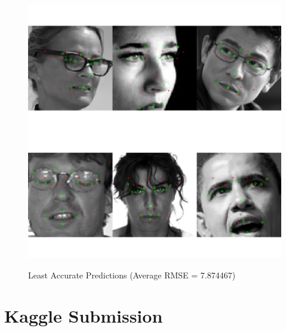 \documentclass[journal]{IEEEtran}
\begin{document}
\begin{figure}[!htb]
  \centering
  \caption{Least Accurate Predictions (Average RMSE = 7.874467)}
  \includegraphics[scale=.6]{worst_faces.pdf}
  \label{fig:worst_faces}
\end{figure}

\section{Kaggle Submission}



\end{document}
